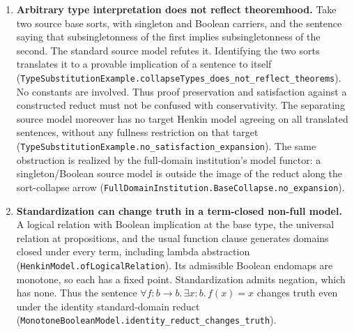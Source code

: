 \documentclass[11pt]{article}
\theoremstyle{definition}
\theoremstyle{remark}
\begin{document}
\begin{enumerate}
  Megalodon's types carry type variables and a prefix type quantifier; the
  implemented partial instantiation returns no image for the quantifier.
  Plain types of depth zero instantiate independently of the environment,
  while no fixed translation of a free type variable agrees with every
  environment assignment
  (\nolinkurl{HenkinTypeFragment.instantiate_all},
  \nolinkurl{instantiate_plain_environment_independent},
  \nolinkurl{no_uniform_translation}). These are boundaries of the stated
  translation, not a theorem excluding every encoding of polymorphic logic.
  Plain types now instantiate at every finite context depth; only in-scope
  variable assignments matter, and shifting and native instantiation obey
  semantic reindexing laws. Full prefix-polymorphic sentence and kernel
  comparison remains open.
\item \textbf{Arbitrary type interpretation does not reflect theoremhood.}
  Take two source base sorts, with singleton and Boolean carriers, and the
  sentence saying that subsingletonness of the first implies
  subsingletonness of the second. The standard source model refutes it.
  Identifying the two sorts translates it to a provable implication of a
  sentence to itself
  (\nolinkurl{TypeSubstitutionExample.collapseTypes_does_not_reflect_theorems}).
  No constants are involved. Thus proof preservation and satisfaction
  against a constructed reduct must not be confused with conservativity.
  The separating source model moreover has no target Henkin model agreeing
  on all translated sentences, without any fullness restriction on that
  target (\nolinkurl{TypeSubstitutionExample.no_satisfaction_expansion}).
  The same obstruction is realized by the full-domain institution's model
  functor: a singleton/Boolean source model is outside the image of the
  reduct along the sort-collapse arrow
  (\nolinkurl{FullDomainInstitution.BaseCollapse.no_expansion}).
\item \textbf{Standardization can change truth in a term-closed non-full model.}
  A logical relation with Boolean implication at the base type, the universal
  relation at propositions, and the usual function clause generates domains
  closed under every term, including lambda abstraction
  (\nolinkurl{HenkinModel.ofLogicalRelation}). Its admissible Boolean endomaps
  are monotone, so each has a fixed point. Standardization admits negation,
  which has none. Thus the sentence
  $\forall f:b\to b.\,\exists x:b.\,f(x)=x$ changes truth even under the
  identity standard-domain reduct
  (\nolinkurl{MonotoneBooleanModel.identity_reduct_changes_truth}).

\end{enumerate}
\end{document}
